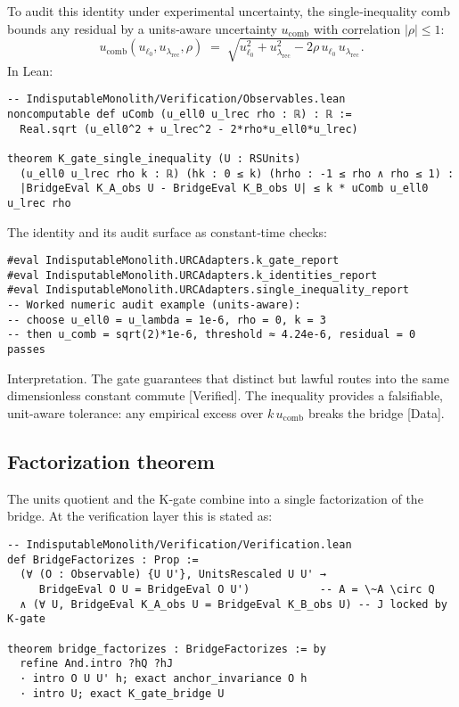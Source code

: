 \documentclass[11pt,a4paper,twoside]{article}
\numberwithin{equation}{section}
\theoremstyle{customthm}
\theoremstyle{customdef}
\theoremstyle{customrem}
\begin{document}
To audit this identity under experimental uncertainty, the single‐inequality comb bounds any residual by a units‐aware uncertainty \(u_{\mathrm{comb}}\) with correlation \(|\rho|\le 1\):
\[
u_{\mathrm{comb}}(u_{\ell_0},u_{\lambda_{\mathrm{rec}}},\rho)
\;=\; \sqrt{u_{\ell_0}^2 + u_{\lambda_{\mathrm{rec}}}^2 - 2\rho\,u_{\ell_0}\,u_{\lambda_{\mathrm{rec}}}}.
\]
In Lean:
\begin{lstlisting}
-- IndisputableMonolith/Verification/Observables.lean
noncomputable def uComb (u_ell0 u_lrec rho : ℝ) : ℝ :=
  Real.sqrt (u_ell0^2 + u_lrec^2 - 2*rho*u_ell0*u_lrec)

theorem K_gate_single_inequality (U : RSUnits)
  (u_ell0 u_lrec rho k : ℝ) (hk : 0 ≤ k) (hrho : -1 ≤ rho ∧ rho ≤ 1) :
  |BridgeEval K_A_obs U - BridgeEval K_B_obs U| ≤ k * uComb u_ell0 u_lrec rho
\end{lstlisting}

The identity and its audit surface as constant‐time checks:
\begin{lstlisting}
#eval IndisputableMonolith.URCAdapters.k_gate_report
#eval IndisputableMonolith.URCAdapters.k_identities_report
#eval IndisputableMonolith.URCAdapters.single_inequality_report
-- Worked numeric audit example (units-aware):
-- choose u_ell0 = u_lambda = 1e-6, rho = 0, k = 3
-- then u_comb = sqrt(2)*1e-6, threshold ≈ 4.24e-6, residual = 0 passes
\end{lstlisting}

Interpretation. The gate guarantees that distinct but lawful routes into the same dimensionless constant commute [Verified]. The inequality provides a falsifiable, unit-aware tolerance: any empirical excess over \(k\,u_{\mathrm{comb}}\) breaks the bridge [Data].

\subsection{Factorization theorem}

The units quotient and the K‐gate combine into a single factorization of the bridge. At the verification layer this is stated as:
\begin{lstlisting}
-- IndisputableMonolith/Verification/Verification.lean
def BridgeFactorizes : Prop :=
  (∀ (O : Observable) {U U'}, UnitsRescaled U U' →
     BridgeEval O U = BridgeEval O U')           -- A = \~A \circ Q
  ∧ (∀ U, BridgeEval K_A_obs U = BridgeEval K_B_obs U) -- J locked by K‑gate

theorem bridge_factorizes : BridgeFactorizes := by
  refine And.intro ?hQ ?hJ
  · intro O U U' h; exact anchor_invariance O h
  · intro U; exact K_gate_bridge U
\end{lstlisting}
\end{document}
